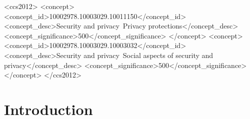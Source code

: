 \documentclass[manuscript,natbib=false]{acmart}
\begin{document}
\begin{CCSXML}
    <ccs2012>
        <concept>
            <concept_id>10002978.10003029.10011150</concept_id>
            <concept_desc>Security and privacy~Privacy protections</concept_desc>
            <concept_significance>500</concept_significance>
        </concept>
        <concept>
            <concept_id>10002978.10003029.10003032</concept_id>
            <concept_desc>Security and privacy~Social aspects of security and privacy</concept_desc>
            <concept_significance>500</concept_significance>
        </concept>
    </ccs2012>
\end{CCSXML}





\maketitle

\section{Introduction}
\end{document}
